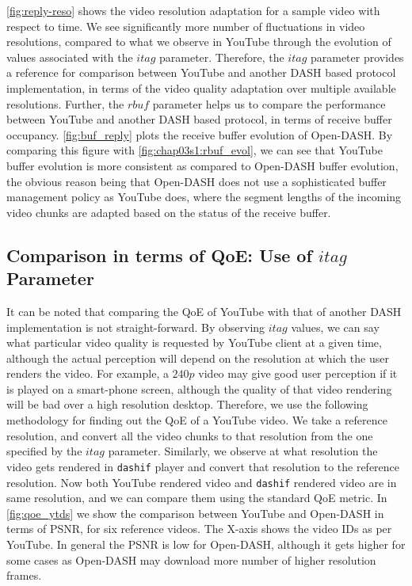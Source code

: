 \fig\ref{fig:reply-reso} shows the video resolution adaptation for a sample video with respect to time. We see significantly more number of fluctuations in video resolutions, compared to what we observe in YouTube through the evolution of values associated with the $itag$ parameter. Therefore, the $itag$ parameter provides a reference for comparison between YouTube and another DASH based protocol implementation, in terms of the video quality adaptation over multiple available resolutions. Further, the $rbuf$ parameter helps us to compare the performance between YouTube and another DASH based protocol, in terms of receive buffer occupancy. \fig\ref{fig:buf_reply} plots the receive buffer evolution of Open-DASH. By comparing this figure with \fig\ref{fig:chap03s1:rbuf_evol}, we can see that YouTube buffer evolution is more consistent as compared to Open-DASH buffer evolution, the obvious reason being that Open-DASH does not use a sophisticated buffer management policy as YouTube does, where the segment lengths of the incoming video chunks are adapted based on the status of the receive buffer.

% 
% 
\subsection{Comparison in terms of QoE: Use of $itag$ Parameter}

It can be noted that comparing the QoE of YouTube with that of another DASH implementation is not straight-forward. By observing $itag$ values, we can say what particular video quality is requested by YouTube client at a given time, although the actual perception will depend on the resolution at which the user renders the video. For example, a $240p$ video may give good user perception if it is played on a smart-phone screen, although the quality of that video rendering will be bad over a high resolution desktop. Therefore, we use the following methodology for finding out the QoE of a YouTube video. We take a reference resolution, and convert all the video chunks to that resolution from the one specified by the $itag$ parameter. Similarly, we observe at what resolution the video gets rendered in \texttt{dashif} player and convert that resolution to the reference resolution. Now both YouTube rendered video and \texttt{dashif} rendered video are in same resolution, and we can compare them using the standard QoE metric. In \fig\ref{fig:qoe_ytds} we show the comparison between YouTube and Open-DASH in terms of PSNR, for six reference videos. The X-axis shows the video IDs as per YouTube. In general the PSNR is low for Open-DASH, although it gets higher for some cases as Open-DASH may download more number of higher resolution frames. 

